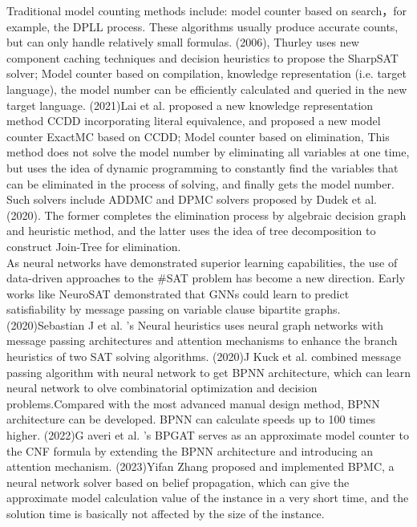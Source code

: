Traditional model counting methods include: model counter based on search，for example, 
the DPLL process. These algorithms usually produce accurate counts, but can only handle 
relatively small formulas. (2006), Thurley uses new component caching techniques and 
decision heuristics to propose the SharpSAT solver\cite{B9}; Model counter based on 
compilation, knowledge representation (i.e. target language), the model number can be 
efficiently calculated and queried in the new target language.  (2021)Lai et al. proposed 
a new knowledge representation method CCDD\cite{A21} incorporating literal equivalence, 
and proposed a new model counter ExactMC\cite{A22} based on CCDD; Model counter based 
on elimination, This method does not solve the model number by eliminating all variables 
at one time, but uses the idea of dynamic programming to constantly find the variables 
that can be eliminated in the process of solving, and finally gets the model number. Such 
solvers include ADDMC\cite{A20} and DPMC\cite{A23} solvers proposed by Dudek et al. (2020). 
The former completes the elimination process by algebraic decision graph and heuristic 
method, and the latter uses the idea of tree decomposition to construct Join-Tree for 
elimination.\\
As neural networks have demonstrated superior learning capabilities, the use of data-driven 
approaches to the \#SAT problem has become a new direction. Early works like NeuroSAT\cite{A24} 
demonstrated that GNNs could learn to predict satisfiability by message passing on  variable 
clause bipartite graphs. (2020)Sebastian J et al. 's Neural heuristics\cite{A25} uses neural 
graph networks with message passing architectures and attention mechanisms to enhance the 
branch heuristics of two SAT solving algorithms. (2020)J Kuck et al. combined message passing 
algorithm with neural network to get BPNN architecture, which can learn neural network to 
olve combinatorial optimization and decision problems.Compared with the most advanced manual 
design method, BPNN architecture can be developed. BPNN can calculate speeds up to 100 times 
higher. (2022)G averi et al. 's BPGAT\cite{A26} serves as an approximate model counter to the 
CNF formula by extending the BPNN architecture and introducing an attention mechanism. 
(2023)Yifan Zhang proposed and implemented BPMC\cite{M1}, a neural network solver based on 
belief propagation, which can give the approximate model calculation value of the instance 
in a very short time, and the solution time is basically not affected by the size of the 
instance.
